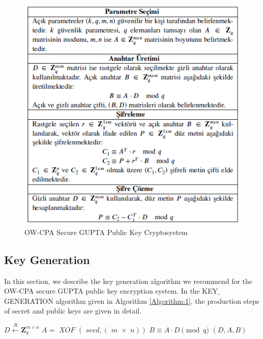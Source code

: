 \documentclass[a4paper,fleqn]{cas-dc}
\begin{document}
	\begin{figure}
		\centering
			\includegraphics[scale=.7]{figs/fig1.png}
		\caption{OW-CPA Secure GUPTA Public Key Cryptosystem}
		\label{FIG:1}
	\end{figure}









\subsection{Key Generation}

	In this section, we describe the key generation algorithm we recommend for the OW-CPA secure GUPTA public key encryption system. In the KEY$\_$GENERATION algorithm given in Algorithm \ref{Algorithm:1}, the production steps of secret and public keys are given in detail.

	\begin{algorithm}
		\label{keygen}
		\begin{algorithmic}
			\State $ D \overset{R}{\longleftarrow}  \mathbf{Z}_q^{m \times n} $ 
			\State $ A = \textit{ XOF } (\textit{ seed}, (\textit{ m $\times$ n}))$ 
			\State $ B   \equiv A \cdot D \pmod q $
			\State \Return $ (D, A, B) $ 
			\EndProcedure
		\end{algorithmic}
		\label{Algorithm:1}
	\end{algorithm}
\end{document}
